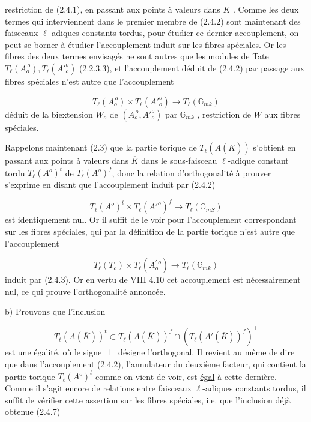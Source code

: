 
restriction de (2.4.1), en passant aux points à valeurs dans $\overline{K}$ . Comme les deux termes qui interviennent dans le premier membre de (2.4.2) sont maintenant des faisceaux $\ell$-adiques constants tordus, pour étudier ce dernier accouplement, on peut se borner à étudier l'accouplement induit sur les fibres spéciales. Or les fibres des deux termes envisagés ne sont autres que les modules de Tate $T_{\ell}(A_{o}^{\,o}),T_{\ell}({A'}^{o}_{o})$ (2.2.3.3), et l'accouplement déduit de (2.4.2) par passage aux fibres spéciales n'est autre que l'accouplement

\begin{equation}\tag{2.4.3}
T_{\ell}(A_{o}^{\,o}) \times T_{\ell}({A'}^{o}_{o}) \longrightarrow T_{\ell}(\mathbb{G}_{mk})
\end{equation}
déduit de la biextension $W_{o}$ de $(A_{o}^{\,o},{A'}^{o}_{o})$ par $\mathbb{G}_{mk}$ , restriction de $W$ aux fibres spéciales.

Rappelons maintenant (2.3) que la partie torique de $T_{\ell}(A(\overline{K}))$ s'obtient en passant aux points à valeurs dans $\overline{K}$ dans le sous-faisceau $\ell$-adique constant tordu $T_{\ell}(A^{o})^{t}$ de $T_{\ell}(A^{o})^{f}$, donc la relation d'orthogonalité à prouver s'exprime en disant que l'accouplement induit par (2.4.2)

\begin{equation}\tag{2.4.4}
T_{\ell}(A^{o})^{t} \times T_{\ell}({A'}^{o})^{f} \longrightarrow T_{\ell}(\mathbb{G}_{mS})
\end{equation}
est identiquement nul. Or il suffit de le voir pour l'accouplement correspondant sur les fibres spéciales, qui par la définition de la partie torique n'est autre que l'accouplement

\begin{equation}\tag{2.4.5}
T_{\ell}(T_{o}) \times T_{\ell}(A_{o}^{\prime\,o}) \longrightarrow T_{\ell}(\mathbb{G}_{mk})
\end{equation}
induit par (2.4.3). Or en vertu de VIII 4.10 cet accouplement est nécessairement nul, ce qui prouve l'orthogonalité annoncée.



b)  Prouvons que l'inclusion

\begin{equation}\tag{2.4.6}
T_{\ell}(A(\overline{K}))^{t} \subset T_{\ell}(A(\overline{K}))^{f} \cap (T_{\ell}(A'(\overline{K}))^{f})^{\perp}
\end{equation}
est une égalité, où le signe $\perp$ désigne l'orthogonal. Il revient au même de dire que dans l'accouplement (2.4.2), l'annulateur du deuxième facteur, qui contient la partie torique $T_{\ell}(A^{o})^{t}$ comme on vient de voir, est \underline{égal} à cette dernière. Comme il s'agit encore de relations entre faisceaux $\ell$-adiques constants tordus, il suffit de vérifier cette assertion sur les fibres spéciales, i.e. que l'inclusion déjà obtenue (2.4.7)

